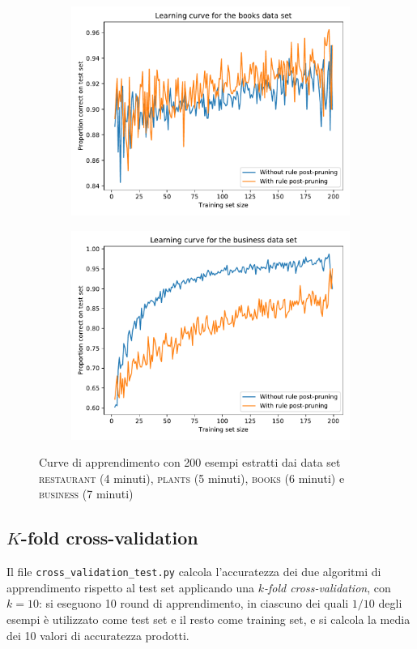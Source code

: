 \documentclass{article}
\newcommand{\restaurant}{\textsc{restaurant}}
\newcommand{\plants}{\textsc{plants}}
\newcommand{\books}{\textsc{books}}
\newcommand{\business}{\textsc{business}}
\begin{document}
\begin{figure}[t]
		\begin{subfigure}{0.45\textwidth} 
			\includegraphics[width=\textwidth]{books_6min.pdf}       
		\end{subfigure}    
		\hfill
		\begin{subfigure}{0.45\textwidth} 
			\includegraphics[width=\textwidth]{business_7min.pdf}       
		\end{subfigure}   
		\caption{Curve di apprendimento con 200 esempi estratti dai data set \restaurant{} (4 minuti), \plants{} (5 minuti), \books{} (6 minuti) e \business{} (7 minuti)}
		\label{fig:curva}
	\end{figure}
	
	\subsection{$K$-fold cross-validation} \label{sec:cross}
	Il file \texttt{cross\_validation\_test.py} calcola l'accuratezza dei due algoritmi di apprendimento rispetto al test set applicando una \emph{$k$-fold cross-validation}, con $k=10$: si eseguono 10 round di apprendimento, in ciascuno dei quali $1/10$ degli esempi è utilizzato come test set e il resto come training set, e si calcola la media dei 10 valori di accuratezza prodotti.
	
\end{document}
